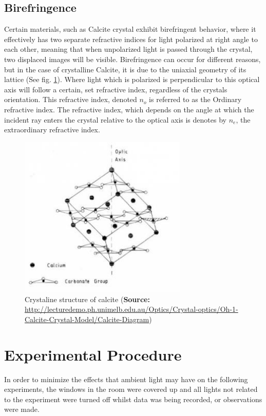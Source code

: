 \documentclass[%
 reprint,
 amsmath,amssymb,
 aps,
]{revtex4-1}
\begin{document}
  \subsection{Birefringence}
    Certain materials, such as Calcite crystal exhibit birefringent behavior, where it effectively has two separate refractive indices for light polarized at right angle to each other, meaning that when unpolarized light is passed through the crystal, two displaced images will be visible. Birefringence can occur for different reasons, but in the case of crystalline Calcite, it is due to the uniaxial geometry of its lattice (See fig. \ref{fig:calcite}). Where light which is polarized is perpendicular to this optical axis will follow a certain, set refractive index, regardless of the crystals orientation. This refractive index, denoted $n_o$ is referred to as the Ordinary refractive index. The refractive index, which depends on the angle at which the incident ray enters the crystal relative to the optical axis is denotes by $n_e$, the extraordinary refractive index.

    \begin{figure}[h!]
      \center
      \includegraphics[width=8cm]{scripts/figs/calcite.jpg}
      \caption{Crystaline structure of calcite (\textbf{Source:} \url{http://lecturedemo.ph.unimelb.edu.au/Optics/Crystal-optics/Oh-1-Calcite-Crystal-Model/Calcite-Diagram})}
      \label{fig:calcite}
    \end{figure}

\section{\label{section:experimental}Experimental Procedure} 
  
  In order to minimize the effects that ambient light may have on the following experiments, the windows in the room were covered up and all lights not related to the experiment were turned off whilst data was being recorded, or observations were made.
\end{document}
